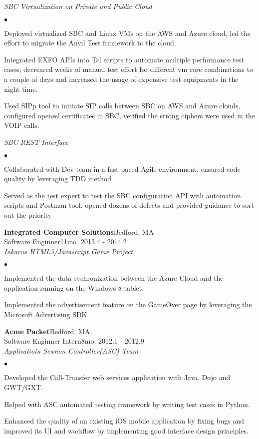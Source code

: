 \documentclass[10pt]{article}
\newcommand{\company}[5]{
    \large{\textbf{#1}}\hfill \small{#3}\\
    #2\hfill \small{#4}\small{#5}\\
}
\newcommand{\project}[1]{\checkmark\normalsize{{\emph{#1}}}\\}
\newenvironment{achievements}
    {\begin{list}
        {$\bullet$}{\topsep 0pt \itemsep -1pt}} 
    {\end{list}}
\begin{document}
\project{SBC Virtualization on Private and Public Cloud}
  \begin{achievements}
\item Deployed virtualized SBC and Linux VMs on the AWS and Azure cloud, led the effort to migrate the Anvil Test framework to the cloud.
\item Integrated EXFO APIs into Tcl scripts to automate multiple performance test cases, decreased weeks of manual test effort for different vm core combinations to a couple of days and increased the usage of expensive test equipments in the night time.
\item Used SIPp tool to initiate SIP calls between SBC on AWS and Azure clouds, configured openssl certificates in SBC, verified the strong ciphers were used in the VOIP calls.
  \end{achievements}

  \project{SBC REST Interface}
  \begin{achievements}
\item Collaborated with Dev team in a fast-paced Agile environment, ensured code quality by leveraging TDD method
\item Served as the test expert to test the SBC configuration API with automation scripts and Postman tool, opened dozens of defects and provided guidance to sort out the priority
  \end{achievements}

\vspace*{5pt}

  \company{Integrated Computer Solutions}{Software Enginner}{Bedford, MA}{11mo. }{2013.4 - 2014.2}

    \project{Inkarus HTML5/Javascript Game Project}
  \begin{achievements}
\item Implemented the data sychronization between the Azure Cloud and the application running on the Windows 8 tablet.
\item Implemented the advertisement feature on the GameOver page by leveraging the Microsoft Advertising SDK
  \end{achievements}

\vspace*{5pt}
  \company{Acme Packet}{Software Enginner Intern}{Bedford, MA}{8mo. }{2012.1 - 2012.9}

  \project{Applicatioin Session Controller(ASC) Team}
  \begin{achievements}
\item Developed the Call-Transfer web services application with Java, Dojo and GWT/GXT.
\item Helped with ASC automated testing framework by writing test cases in Python.
\item Enhanced the quality of an existing iOS mobile application by fixing bugs and improved its UI and workflow by implementing good interface design principles.
  \end{achievements}
\end{document}
